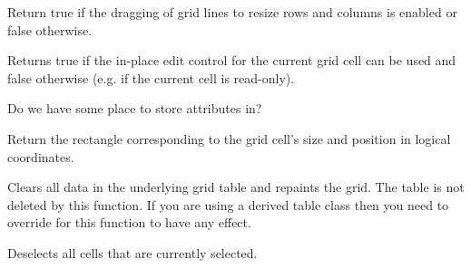 
Return true if the dragging of grid lines to resize rows and columns is enabled or false otherwise.



\label{wxgridcanenablecellcontrol}


Returns true if the in-place edit control for the current grid cell can be used and
false otherwise (e.g. if the current cell is read-only).



\label{wxgridcanhaveattributes}


Do we have some place to store attributes in?



\label{wxgridcelltorect}



Return the rectangle corresponding to the grid cell's size and position in logical
coordinates.



\label{wxgridcleargrid}


Clears all data in the underlying grid table and repaints the grid. The table is not deleted by
this function. If you are using a derived table class then you need to override
 for this function to have any effect.



\label{wxgridclearselection}


Deselects all cells that are currently selected.



\label{wxgridcreategrid}


